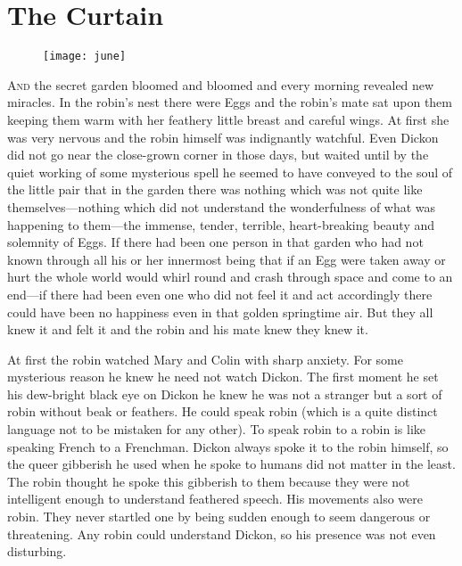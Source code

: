 \chapter{The Curtain} 
	
\begin{figure}[t!]
\centering
\texttt{[image: june]}
\end{figure}

 \lettrine[]{A}{nd} the secret garden bloomed and bloomed and every morning revealed new miracles. In the robin's nest there were Eggs and the robin's mate sat upon them keeping them warm with her feathery little breast and careful wings. At first she was very nervous and the robin himself was indignantly watchful. Even Dickon did not go near the close-grown corner in those days, but waited until by the quiet working of some mysterious spell he seemed to have conveyed to the soul of the little pair that in the garden there was nothing which was not quite like themselves—nothing which did not understand the wonderfulness of what was happening to them—the immense, tender, terrible, heart-breaking beauty and solemnity of Eggs. If there had been one person in that garden who had not known through all his or her innermost being that if an Egg were taken away or hurt the whole world would whirl round and crash through space and come to an end—if there had been even one who did not feel it and act accordingly there could have been no happiness even in that golden springtime air. But they all knew it and felt it and the robin and his mate knew they knew it.

At first the robin watched Mary and Colin with sharp anxiety. For some mysterious reason he knew he need not watch Dickon. The first moment he set his dew-bright black eye on Dickon he knew he was not a stranger but a sort of robin without beak or feathers. He could speak robin (which is a quite distinct language not to be mistaken for any other). To speak robin to a robin is like speaking French to a Frenchman. Dickon always spoke it to the robin himself, so the queer gibberish he used when he spoke to humans did not matter in the least. The robin thought he spoke this gibberish to them because they were not intelligent enough to understand feathered speech. His movements also were robin. They never startled one by being sudden enough to seem dangerous or threatening. Any robin could understand Dickon, so his presence was not even disturbing.

